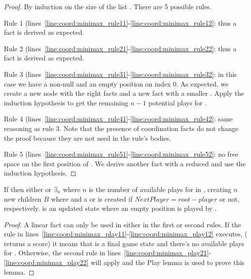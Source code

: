 \begin{proof}
By induction on the size of the list . There are 5 possible rules.

Rule 1 (lines~\ref{line:coord:minimax_rule11}-\ref{line:coord:minimax_rule12}:
 thus a  fact is derived as expected.

Rule 2 (lines~\ref{line:coord:minimax_rule21}-\ref{line:coord:minimax_rule22}:
 thus a  fact is derived as expected.

Rule 3 (lines~\ref{line:coord:minimax_rule31}-\ref{line:coord:minimax_rule32}:
in this case we have a non-null  and an empty position on index
0. As expected, we create a new  node with the right facts and a new
 fact with a smaller . Apply the induction
hypothesis to get the remaining $n-1$ potential plays for .

Rule 4 (lines~\ref{line:coord:minimax_rule41}-\ref{line:coord:minimax_rule42}:
same reasoning as rule 3. Note that the presence of coordination facts do not
change the proof because they are not used in the rule's bodies.

Rule 5 (lines~\ref{line:coord:minimax_rule51}-\ref{line:coord:minimax_rule52}:
no free space on the first position of . We derive another
 fact with a reduced  and use the induction
hypothesis.

\end{proof}

\begin{lemma}
If  then either  or $\exists_n$ where $n$ is the number of available plays for
 in , creating $n$ new children $B$ where  and a  or  is created if
         $NextPlayer = root-player$ or not, respectively.  is an
         updated  state where an empty position is played by
         .
\end{lemma}
\begin{proof}

A linear fact  can only be used
in either in the first or second rules.
If the rule in
lines~\ref{line:coord:minimax_play11}-\ref{line:coord:minimax_play12} executes,
( returns a score) it means that  is a final
game state and there's no available plays for .
Otherwise, the second rule in
lines~\ref{line:coord:minimax_play21}-\ref{line:coord:minimax_play22} will
apply and the Play lemma is used to prove this lemma.

\end{proof}

